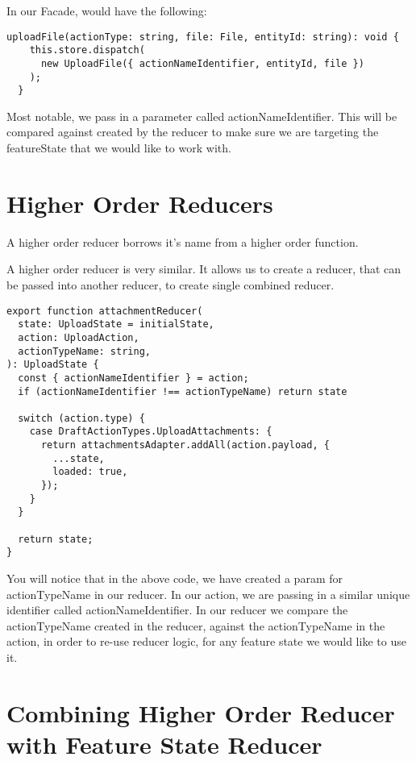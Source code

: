 In our Facade, would have the following:

\begin{lstlisting}
uploadFile(actionType: string, file: File, entityId: string): void {
    this.store.dispatch(
      new UploadFile({ actionNameIdentifier, entityId, file })
    );
  }
\end{lstlisting}

Most notable, we pass in a parameter called actionNameIdentifier. This will be
compared against created by the reducer to make sure we are targeting the
featureState that we would like to work with.

\section{Higher Order Reducers}

A higher order reducer borrows it's name from a higher order function.


A higher order reducer is very similar. It allows us to create a reducer, that
can be passed into another reducer, to create single combined reducer.

\begin{lstlisting}
export function attachmentReducer(
  state: UploadState = initialState,
  action: UploadAction,
  actionTypeName: string,
): UploadState {
  const { actionNameIdentifier } = action;
  if (actionNameIdentifier !== actionTypeName) return state

  switch (action.type) {
    case DraftActionTypes.UploadAttachments: {
      return attachmentsAdapter.addAll(action.payload, {
        ...state,
        loaded: true,
      });
    }
  }

  return state;
}
\end{lstlisting}

You will notice that in the above code, we have created a param for
actionTypeName in our reducer. In our action, we are passing in a similar unique
identifier called actionNameIdentifier. In our reducer we compare the
actionTypeName created in the reducer, against the actionTypeName in the action,
in order to re-use reducer logic, for any feature state we would like to use it.

\section{Combining Higher Order Reducer with Feature State Reducer }

